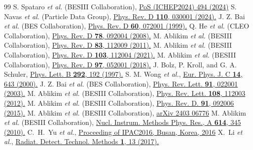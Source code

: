 \documentclass[amsmath,amssymb,twocolumn,prd,floatfix,showpacs,nofootinbib]{revtex4-1}
\begin{document}
\begin{thebibliography}{99}
 S. Spataro {\it et al.} (BESIII Collaboration), \href{https://doi.org/10.22323/1.476.0494}{PoS (ICHEP2024) 494 (2024)}
 S. Navas {\it et al.} (Particle Data Group), \href{https://journals.aps.org/prd/pdf/10.1103/PhysRevD.110.030001}{Phys. Rev. D {\bf 110}, 030001 (2024).}
 J. Z. Bai {\it et al.} (BES Collaboration), \href{https://doi.org/10.1103/PhysRevD.60.072001}{Phys. Rev. D {\bf 60}, 072001 (1999).}
Q. He {\it et al.} (CLEO Collaboration), \href{https://doi.org/10.1103/PhysRevD.78.092004}{Phys. Rev. D {\bf 78}, 092004 (2008).}
M. Ablikim {\it et al.} (BESIII Collaboration), \href{https://doi.org/10.1103/PhysRevD.83.112009}{Phys. Rev. D {\bf 83}, 112009 (2011).}
M. Ablikim {\it et al.} (BESIII Collaboration), \href{https://doi.org/10.1103/PhysRevD.103.112004}{Phys. Rev. D {\bf 103}, 112004 (2021).}
M. Ablikim {\it et al.} (BESIII Collaboration), \href{https://doi.org/10.1103/PhysRevD.97.052011}{Phys. Rev. D {\bf 97}, 052001 (2018).}
J. Bolz, P. Kroll, and G. A. Schuler, \href{http://dx.doi.org/10.1016/S0370-2693(96)01515-8}{Phys. Lett. B {\bf 292}, 192 (1997).}
S. M. Wong {\it et al.}, \href{http://dx.doi.org/10.1007/s100520000376}{Eur. Phys. J. C {\bf 14}, 643 (2000).}
 J. Z. Bai {\it et al.} (BES Collaboration), \href{https://doi.org/10.1103/PhysRevLett.91.022001}{Phys. Rev. Lett. {\bf 91}, 022001 (2003).}
 M. Ablikim {\it et al.} (BESIII Collaboration), \href{https://doi.org/10.1103/PhysRevLett.108.112003}{Phys. Rev. Lett. {\bf 108}, 112003 (2012).}
 M. Ablikim {\it et al.} (BESIII Collaboration), \href{https://journals.aps.org/prd/abstract/10.1103/PhysRevD.91.092006}{Phys. Rev. D. {\bf 91}, 092006 (2015).}
 M. Ablikim {\it et al.} (BESIII Collaboration),
\href{http://arxiv.org/abs/2403.06766}{arXiv 2403 06776}
 M. Ablikim {\it et al.} (BESIII Collaboration), \href{https://www.sciencedirect.com/science/article/pii/S0168900209023870}{Nucl. Instrum. Methods Phys. Res., A {\bf614}, 345 (2010).}	
 C.~H.~Yu {\it et al.}, \href{https://accelconf.web.cern.ch/ipac2016/doi/JACoW-IPAC2016-TUYA01.html}{Proceeding of IPAC2016, Busan, Korea, 2016}
 X.~Li {\it et al.}, \href{https://link.springer.com/article/10.1007/s41605-017-0014-2} {Radiat. Detect. Technol. Methods {\bf 1}, 13 (2017).}


\end{thebibliography}
\end{document}
